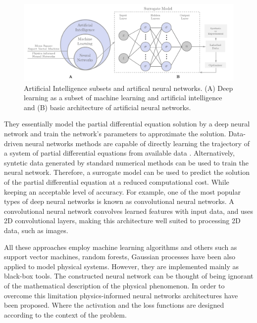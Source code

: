 \documentclass[11pt,twoside]{article}
\begin{document}
\begin{figure}[h]
\centering
    \includegraphics[width=1.0\textwidth]{figs/artificial_intelligence_subsets.pdf}
    \caption{Artificial Intelligence subsets and artifical neural networks. (A) Deep learning as a subset of machine 
    learning and artificial intelligence and (B) basic architecture of artificial neural networks.}    
    \label{deep_learning_subset_architecture}
\end{figure}

They essentially model the partial differential equation solution by a deep neural network and train the 
network’s parameters to approximate the solution. Data-driven neural networks methods are capable of directly 
learning the trajectory of a system of partial differential equations from available data 
\citep{li_neural_2020,li_fourier_2021}. Alternatively, syntetic data generated by standard numerical 
methods can be used to train the neural network. Therefore, a surrogate model can be used to predict the
solution of the partial differential equation at a reduced computational cost. While keeping an acceptable
level of accuracy.  For example, one of the most popular types of deep neural networks is known as 
convolutional neural networks. A convolutional neural network convolves learned features with input data, 
and uses 2D convolutional layers, making this architecture well suited to processing 2D data, such as images.

All these approaches employ machine learning algorithms and others such as support vector machines, 
random forests, Gaussian processes have been also applied to model physical systems. However, they 
are implemented mainly as black-box tools. The constructed neural network can be thought of being 
ignorant of the mathematical description of the physical phenomenon. In order to overcome this 
limitation physics-informed neural networks architectures have been proposed. Where the activation 
and the loss functions are designed according to the context of the problem.
\end{document}
